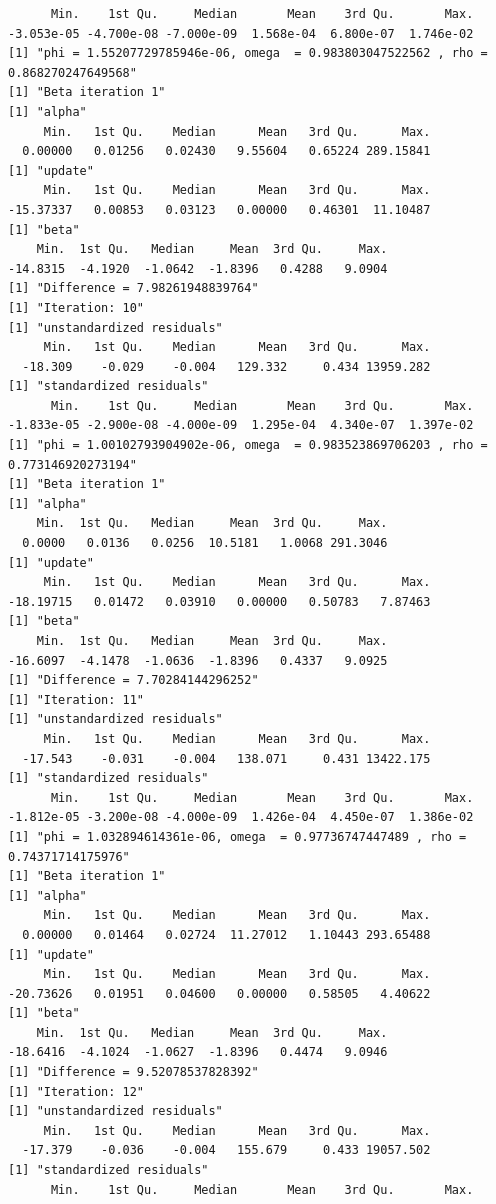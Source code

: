 \documentclass[10pt]{article}
\theoremstyle{definition}
\begin{document}
\begin{itemize}
\begin{verbatim}
      Min.    1st Qu.     Median       Mean    3rd Qu.       Max.
-3.053e-05 -4.700e-08 -7.000e-09  1.568e-04  6.800e-07  1.746e-02
[1] "phi = 1.55207729785946e-06, omega  = 0.983803047522562 , rho = 0.868270247649568"
[1] "Beta iteration 1"
[1] "alpha"
     Min.   1st Qu.    Median      Mean   3rd Qu.      Max.
  0.00000   0.01256   0.02430   9.55604   0.65224 289.15841
[1] "update"
     Min.   1st Qu.    Median      Mean   3rd Qu.      Max.
-15.37337   0.00853   0.03123   0.00000   0.46301  11.10487
[1] "beta"
    Min.  1st Qu.   Median     Mean  3rd Qu.     Max.
-14.8315  -4.1920  -1.0642  -1.8396   0.4288   9.0904
[1] "Difference = 7.98261948839764"
[1] "Iteration: 10"
[1] "unstandardized residuals"
     Min.   1st Qu.    Median      Mean   3rd Qu.      Max.
  -18.309    -0.029    -0.004   129.332     0.434 13959.282
[1] "standardized residuals"
      Min.    1st Qu.     Median       Mean    3rd Qu.       Max.
-1.833e-05 -2.900e-08 -4.000e-09  1.295e-04  4.340e-07  1.397e-02
[1] "phi = 1.00102793904902e-06, omega  = 0.983523869706203 , rho = 0.773146920273194"
[1] "Beta iteration 1"
[1] "alpha"
    Min.  1st Qu.   Median     Mean  3rd Qu.     Max.
  0.0000   0.0136   0.0256  10.5181   1.0068 291.3046
[1] "update"
     Min.   1st Qu.    Median      Mean   3rd Qu.      Max.
-18.19715   0.01472   0.03910   0.00000   0.50783   7.87463
[1] "beta"
    Min.  1st Qu.   Median     Mean  3rd Qu.     Max.
-16.6097  -4.1478  -1.0636  -1.8396   0.4337   9.0925
[1] "Difference = 7.70284144296252"
[1] "Iteration: 11"
[1] "unstandardized residuals"
     Min.   1st Qu.    Median      Mean   3rd Qu.      Max.
  -17.543    -0.031    -0.004   138.071     0.431 13422.175
[1] "standardized residuals"
      Min.    1st Qu.     Median       Mean    3rd Qu.       Max.
-1.812e-05 -3.200e-08 -4.000e-09  1.426e-04  4.450e-07  1.386e-02
[1] "phi = 1.032894614361e-06, omega  = 0.97736747447489 , rho = 0.74371714175976"
[1] "Beta iteration 1"
[1] "alpha"
     Min.   1st Qu.    Median      Mean   3rd Qu.      Max.
  0.00000   0.01464   0.02724  11.27012   1.10443 293.65488
[1] "update"
     Min.   1st Qu.    Median      Mean   3rd Qu.      Max.
-20.73626   0.01951   0.04600   0.00000   0.58505   4.40622
[1] "beta"
    Min.  1st Qu.   Median     Mean  3rd Qu.     Max.
-18.6416  -4.1024  -1.0627  -1.8396   0.4474   9.0946
[1] "Difference = 9.52078537828392"
[1] "Iteration: 12"
[1] "unstandardized residuals"
     Min.   1st Qu.    Median      Mean   3rd Qu.      Max.
  -17.379    -0.036    -0.004   155.679     0.433 19057.502
[1] "standardized residuals"
      Min.    1st Qu.     Median       Mean    3rd Qu.       Max.

\end{verbatim}
\end{itemize}
\end{document}
